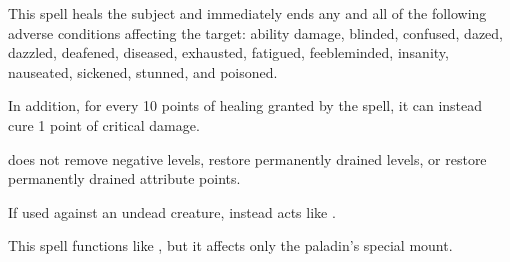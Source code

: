 \spellrng{\rngtouch}
\begin{spelleffect}
  This spell heals the subject and immediately ends any and all of the following adverse conditions affecting the target: ability damage, blinded, confused, dazed, dazzled, deafened, diseased, exhausted, fatigued, feebleminded, insanity, nauseated, sickened, stunned, and poisoned.

  \par In addition, for every 10 points of healing granted by the spell, it can instead cure 1 point of critical damage.
\end{spelleffect}
\begin{spellnotes}
   does not remove negative levels, restore permanently drained levels, or restore permanently drained attribute points.
  \par If used against an undead creature,  instead acts like .
\end{spellnotes}

\spellrng{\rngtouch}
\begin{spelleffect}
  This spell functions like , but it affects only the paladin's special mount.
\end{spelleffect}

